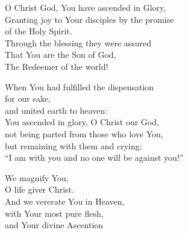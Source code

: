 \documentclass{article}
\begin{document}
%
O Christ God, You have ascended in Glory, \\
Granting joy to Your disciples by the promise \\
    \cont of the Holy Spirit. \\
Through the blessing they were assured \\
That You are the Son of God, \\
The Redeemer of the world!

When You had fulfilled the dispensation \\
    \cont for our sake,\\
and united earth to heaven:\\
You ascended in glory, O Christ our God, \\
not being parted from those who love You, \\
but remaining with them and crying: \\
“I am with you and no one will be against you!”

We magnify You, \\
O life giver Christ.\\
And we vererate You in Heaven, \\
with Your most pure flesh, \\
and Your divine Ascention

\vfill
\end{document}

